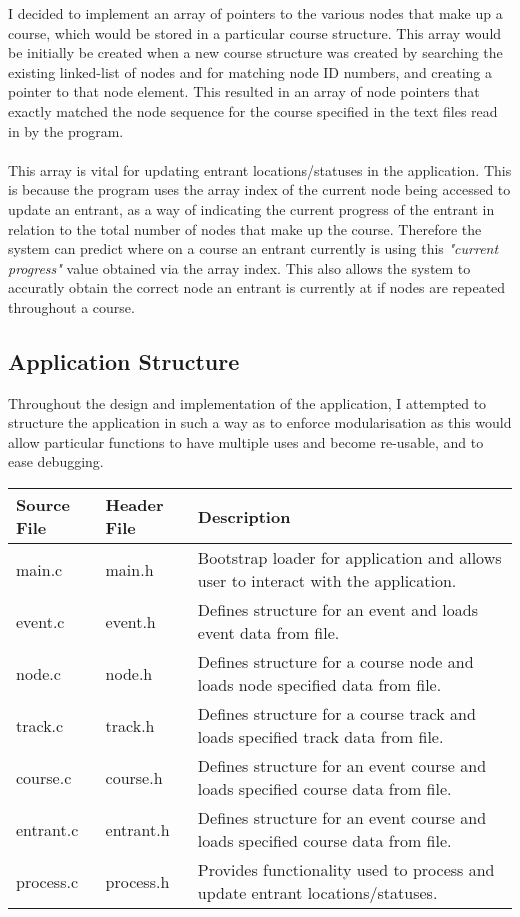 \documentclass[12pt]{article}
\begin{document}
I decided to implement an array of pointers to the various nodes that make up a course, which would be stored in a particular course structure. This array would be initially be created when a new course structure was created by searching the existing linked-list of nodes and for matching node ID numbers, and creating a pointer to that node element. This resulted in an array of node pointers that exactly matched the node sequence for the course specified in the text files read in by the program. \\\\
This array is vital for updating entrant locations/statuses in the application. This is because the program uses the array index of the current node being accessed to update an entrant, as a way of indicating the current progress of the entrant in relation to the total number of nodes that make up the course. Therefore the system can predict where on a course an entrant currently is using this \textit{"current progress"} value obtained via the array index. This also allows the system to accuratly obtain the correct node an entrant is currently at if nodes are repeated throughout a course. 

\subsection{Application Structure}

Throughout the design and implementation of the application, I attempted to structure the application in such a way as to enforce modularisation as this would allow particular functions to have multiple uses and become re-usable, and to ease debugging.\\

\begin{tabular}{| p{1.5cm} | p{1.5cm} | p{8cm} |}
\hline
Source File & Header File & Description \\
\hline
main.c & main.h & Bootstrap loader for application and allows user to interact with the application. \\
\hline
event.c & event.h & Defines structure for an event and loads event data from file. \\
\hline
node.c & node.h & Defines structure for a course node and loads node specified data from file. \\
\hline
track.c & track.h & Defines structure for a course track and loads specified track data from file. \\
\hline
course.c & course.h & Defines structure for an event course and loads specified course data from file. \\
\hline
entrant.c & entrant.h & Defines structure for an event course and loads specified course data from file. \\
\hline
process.c & process.h & Provides functionality used to process and update entrant locations/statuses. \\
\hline

\end{tabular} 
\end{document}
